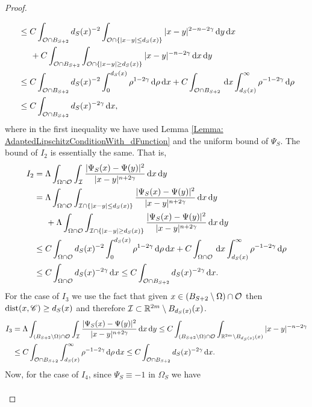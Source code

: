 \begin{proof}
\begin{itemize}
\begin{align*}
&\leq C \int_{\mathcal{O} \cap B_{S+2}} d_S(x)^{-2}\int_{\mathcal{O}\cap\{|x-y|\leq d_S(x)\}} |x-y|^{2-n-2\gamma} \,\mathrm{d} y\,\mathrm{d} x\\
&\hspace{5mm} + C \int_{\mathcal{O} \cap B_{S+2}} \int_{\mathcal{O}\cap\{|x-y|\geq d_S(x)\}} |x-y|^{-n-2\gamma} \,\mathrm{d} x\,\mathrm{d} y\\
&\leq C \int_{\mathcal{O} \cap B_{S+2}} d_S(x)^{-2}\int_0^{d_S(x)} \rho^{1-2\gamma} \,\mathrm{d} \rho\,\mathrm{d} x + C \int_{\mathcal{O} \cap B_{S+2}} \,\mathrm{d} x \int_{d_S(x)}^\infty \rho^{-1-2\gamma} \,\mathrm{d}\rho\\
&\leq C \int_{\mathcal{O} \cap B_{S+2}} d_S(x)^{-2\gamma} \,\mathrm{d} x,
\end{align*}
where in the first inequality we have used Lemma \ref{Lemma: AdaptedLipschitzConditionWith_dFunction} and the uniform bound of $\Psi_S$. The bound of $I_2$ is essentially the same. That is,
\begin{align*}
I_2 &= \Lambda \int_{\Omega \cap \mathcal{O}} \int_{\mathcal{I}} \frac{|\Psi_S(x)-\Psi(y)|^2}{|x-y|^{n+2\gamma}} \,\mathrm{d} x\,\mathrm{d} y\\
&= \Lambda \int_{\Omega \cap \mathcal{O}} \int_{\mathcal{I}\cap\{|x-y|\leq d_S(x)\}} \frac{|\Psi_S(x)-\Psi(y)|^2}{|x-y|^{n+2\gamma}} \,\mathrm{d} x\,\mathrm{d} y\\
&\hspace{5mm} + \Lambda \int_{\Omega \cap \mathcal{O}} \int_{\mathcal{I}\cap\{|x-y|\geq d_S(x)\}} \frac{|\Psi_S(x)-\Psi(y)|^2}{|x-y|^{n+2\gamma}} \,\mathrm{d} x\,\mathrm{d} y\\
&\leq C \int_{\Omega \cap \mathcal{O}} d_S(x)^{-2}\int_0^{d_S(x)} \rho^{1-2\gamma} \,\mathrm{d} \rho\,\mathrm{d} x + C \int_{\Omega \cap \mathcal{O}} \,\mathrm{d} x \int_{d_S(x)}^\infty \rho^{-1-2\gamma} \,\mathrm{d}\rho\\
&\leq C \int_{\Omega \cap \mathcal{O}} d_S(x)^{-2\gamma} \,\mathrm{d} x \leq C \int_{\mathcal{O} \cap B_{S+2}} d_S(x)^{-2\gamma} \,\mathrm{d} x.
\end{align*}
For the case of $I_3$ we use the fact that given $x\in (B_{S+2}\setminus \Omega)\cap \mathcal{O}$ then $\operatorname{dist}(x,\mathscr{C})\geq d_S(x)$ and therefore $\mathcal{I} \subset \mathbb{R}^{2m}\setminus B_{d_S(x)}(x)$.
\begin{align*}
I_3 &= \Lambda \int_{(B_{S+2}\setminus \Omega) \cap \mathcal{O}} \int_{\mathcal{I}} \frac{|\Psi_S(x)-\Psi(y)|^2}{|x-y|^{n+2\gamma}} \,\mathrm{d} x\,\mathrm{d} y \leq C \int_{(B_{S+2}\setminus \Omega) \cap \mathcal{O}} \int_{\mathbb{R}^{2m}\setminus B_{d_S(x)}(x)} |x-y|^{-n-2\gamma} \\
&\leq C \int_{\mathcal{O} \cap B_{S+2}} \int_{d_S(x)}^\infty \rho^{-1-2\gamma} \,\mathrm{d} \rho\,\mathrm{d} x \leq C \int_{\mathcal{O} \cap B_{S+2}} d_S(x)^{-2\gamma} \,\mathrm{d} x.
\end{align*}
Now, for the case of $I_4$, since $\Psi_S\equiv -1$ in $\Omega_S$ we have
\begin{align*}

\end{align*}
\end{itemize}
\end{proof}
